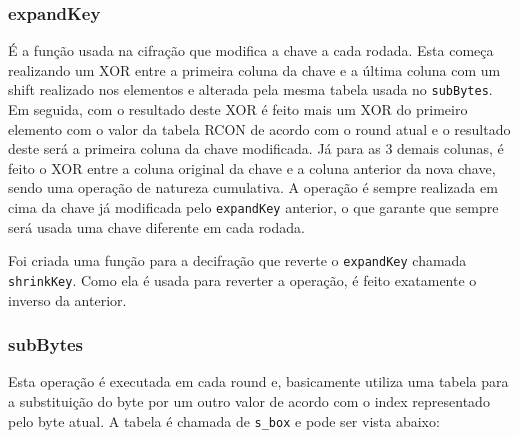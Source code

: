 \documentclass[12pt]{article}
\begin{document}
\subsubsection{expandKey}
É a função usada na cifração que modifica a chave a cada rodada. Esta começa realizando um XOR entre a primeira coluna da chave e a última coluna com um shift realizado nos elementos e alterada pela mesma tabela usada no \texttt{subBytes}. Em seguida, com o resultado deste XOR é feito mais um XOR do primeiro elemento com o valor da tabela RCON de acordo com o round atual e o resultado deste será a primeira coluna da chave modificada. Já para as 3 demais colunas, é feito o XOR entre a coluna original da chave e a coluna anterior da nova chave, sendo uma operação de natureza cumulativa. A operação é sempre realizada em cima da chave já modificada pelo \texttt{expandKey} anterior, o que garante que sempre será usada uma chave diferente em cada rodada.

Foi criada uma função para a decifração que reverte o \texttt{expandKey} chamada \texttt{shrinkKey}. Como ela é usada para reverter a operação, é feito exatamente o inverso da anterior.

\subsubsection{subBytes}
Esta operação é executada em cada round e, basicamente utiliza uma tabela para a substituição do byte por um outro valor de acordo com o index representado pelo byte atual. A tabela é chamada de \texttt{s\_box} e pode ser vista abaixo:
\end{document}
